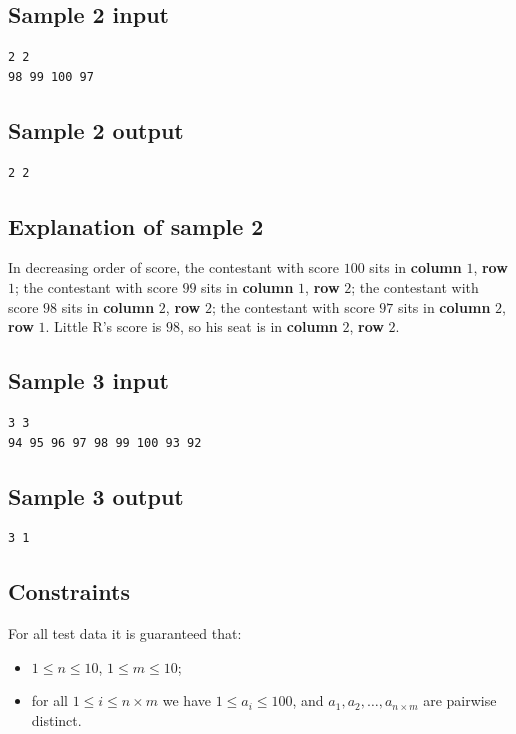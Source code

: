 \documentclass[11pt]{article}
\begin{document}
\subsection*{Sample 2 input}
\begin{verbatim}
2 2
98 99 100 97
\end{verbatim}

\subsection*{Sample 2 output}
\begin{verbatim}
2 2
\end{verbatim}

\subsection*{Explanation of sample 2}

In decreasing order of score,
the contestant with score $100$ sits in \textbf{column} $1$,
\textbf{row} $1$;
the contestant with score $99$ sits in \textbf{column} $1$,
\textbf{row} $2$;
the contestant with score $98$ sits in \textbf{column} $2$,
\textbf{row} $2$;
the contestant with score $97$ sits in \textbf{column} $2$,
\textbf{row} $1$.
Little R's score is $98$,
so his seat is in \textbf{column} $2$, \textbf{row} $2$.

\subsection*{Sample 3 input}
\begin{verbatim}
3 3
94 95 96 97 98 99 100 93 92
\end{verbatim}

\subsection*{Sample 3 output}
\begin{verbatim}
3 1
\end{verbatim}

\subsection*{Constraints}

For all test data it is guaranteed that:
\begin{itemize}
\item $1 \leq n \leq 10$, $1 \leq m \leq 10$;
\item for all $1 \leq i \leq n \times m$ we have $1 \leq a_i \leq 100$,
and $a_1, a_2, \dots, a_{n \times m}$ are pairwise distinct.
\end{itemize}
\end{document}
